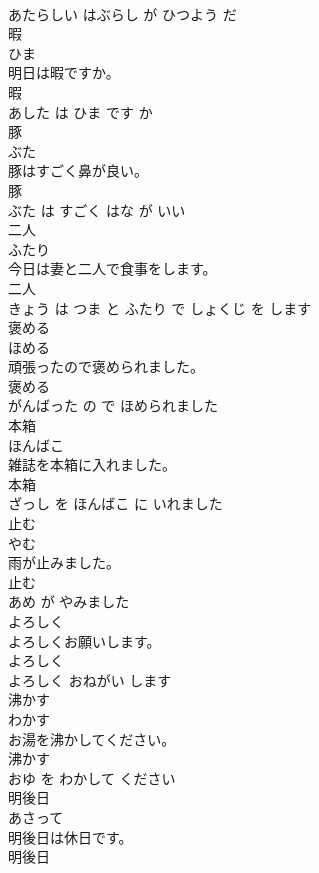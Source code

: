\documentclass[8pt]{extreport}
\begin{document}
\begin{CJK}{UTF8}{min}
\\	あたらしい はぶらし が ひつよう だ			
\\	暇	
\\	ひま			
\\	明日は暇ですか。	
\\	暇 
\\	あした は ひま です か			
\\	豚	
\\	ぶた			
\\	豚はすごく鼻が良い。	
\\	豚 
\\	ぶた は すごく はな が いい			
\\	二人	
\\	ふたり			
\\	今日は妻と二人で食事をします。	
\\	二人 
\\	きょう は つま と ふたり で しょくじ を します			
\\	褒める	
\\	ほめる			
\\	頑張ったので褒められました。	
\\	褒める 
\\	がんばった の で ほめられました			
\\	本箱	
\\	ほんばこ			
\\	雑誌を本箱に入れました。	
\\	本箱 
\\	ざっし を ほんばこ に いれました			
\\	止む	
\\	やむ			
\\	雨が止みました。	
\\	止む 
\\	あめ が やみました			
\\	よろしく	
\\	よろしくお願いします。	
\\	よろしく 
\\	よろしく おねがい します			
\\	沸かす	
\\	わかす			
\\	お湯を沸かしてください。	
\\	沸かす 
\\	おゆ を わかして ください			
\\	明後日	
\\	あさって			
\\	明後日は休日です。	
\\	明後日 

\end{CJK}
\end{document}
